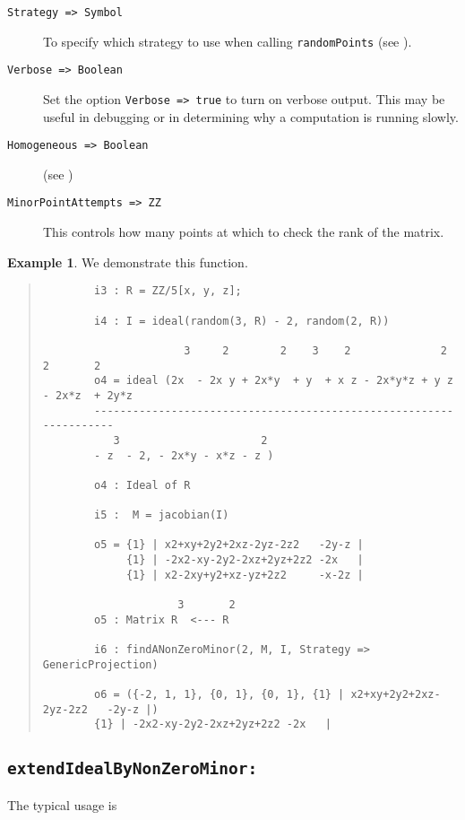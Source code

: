 \documentclass[11pt]{amsart}
\theoremstyle{definition}
\newtheorem{example}{Example}[section]
\begin{document}
\begin{description}
\item[\tt Strategy => Symbol] To specify which strategy to use when calling {\tt randomPoints} (see ).
  
\item[\tt Verbose => Boolean]
  Set the option {\tt Verbose => true} to turn on verbose output.  This may be useful in debugging or in determining why a computation is running slowly.
  
\item[\tt Homogeneous => Boolean] (see )
  
\item[\tt MinorPointAttempts => ZZ] 
  This controls how many points at which to check the rank of the matrix.
\end{description}
\begin{example}
  We demonstrate this function.
  {{\small\color{blue}
  \begin{quote}
\begin{verbatim}
		i3 : R = ZZ/5[x, y, z];
		
		i4 : I = ideal(random(3, R) - 2, random(2, R))
		
		              3     2        2    3    2              2        2       2
		o4 = ideal (2x  - 2x y + 2x*y  + y  + x z - 2x*y*z + y z - 2x*z  + 2y*z 
		-------------------------------------------------------------------
		   3                      2
		- z  - 2, - 2x*y - x*z - z )
		
		o4 : Ideal of R
		
		i5 :  M = jacobian(I)
		
		o5 = {1} | x2+xy+2y2+2xz-2yz-2z2   -2y-z |
		     {1} | -2x2-xy-2y2-2xz+2yz+2z2 -2x   |
		     {1} | x2-2xy+y2+xz-yz+2z2     -x-2z |
		
		             3       2
		o5 : Matrix R  <--- R
		
		i6 : findANonZeroMinor(2, M, I, Strategy => GenericProjection)
		
		o6 = ({-2, 1, 1}, {0, 1}, {0, 1}, {1} | x2+xy+2y2+2xz-2yz-2z2   -2y-z |)
		{1} | -2x2-xy-2y2-2xz+2yz+2z2 -2x   |
\end{verbatim}
\end{quote}  
    }}
\end{example}

\subsection{\tt extendIdealByNonZeroMinor:}\label{extendIdealByNonZeroMinor} The typical usage is 
\end{document}
